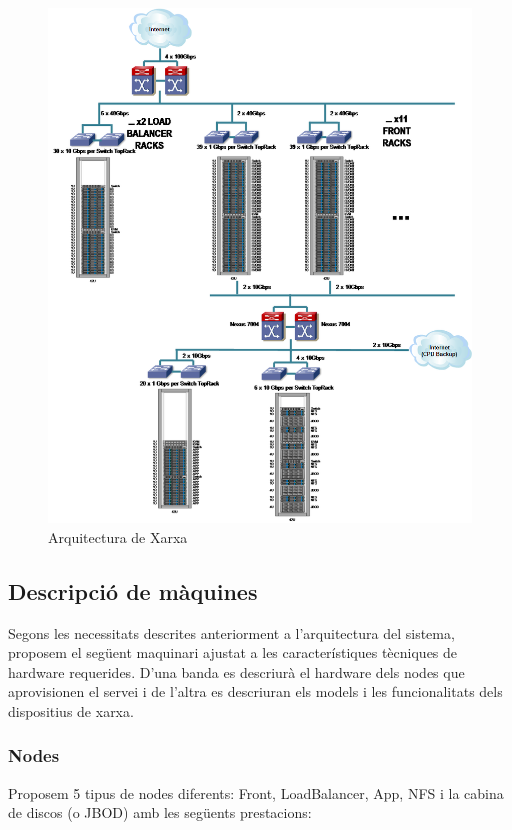 \begin{figure}[H]
    \centering
    \includegraphics[width=0.85 \textwidth]{cpdnetwork}
    \caption{Arquitectura de Xarxa \label{fig:cpd}}    
\end{figure}

\subsection{Descripció de màquines}

Segons les necessitats descrites anteriorment a l’arquitectura del sistema, proposem el següent maquinari ajustat a les característiques tècniques de hardware requerides. D’una banda es descriurà el hardware dels nodes que aprovisionen el servei i de l’altra es descriuran els models i les funcionalitats dels dispositius de xarxa.

\subsubsection{Nodes}

Proposem 5 tipus de nodes diferents: Front, LoadBalancer, App, NFS i la cabina de discos (o JBOD) amb les següents prestacions:

